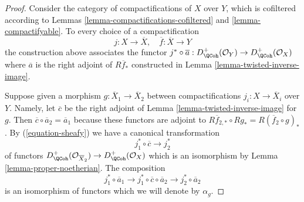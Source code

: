 \begin{proof}
Consider the category of compactifications of $X$ over $Y$,
which is cofiltered according to
Lemmas \ref{lemma-compactifications-cofiltered} and \ref{lemma-compactifyable}.
To every choice of a compactification
$$
j : X \to \overline{X},\quad \overline{f} : \overline{X} \to Y
$$
the construction above associates the functor $j^* \circ \overline{a} :
D_\QCoh^+(\mathcal{O}_Y) \to D_\QCoh^+(\mathcal{O}_X)$
where $\overline{a}$ is the right adjoint of $R\overline{f}_*$
constructed in Lemma \ref{lemma-twisted-inverse-image}.

\medskip\noindent
Suppose given a morphism $g : \overline{X}_1 \to \overline{X}_2$
between compactifications $j_i : X \to \overline{X}_i$ over $Y$.
Namely, let $\overline{c}$ be the right adjoint of
Lemma \ref{lemma-twisted-inverse-image} for $g$.
Then $\overline{c} \circ \overline{a}_2 = \overline{a}_1$
because these functors are adjoint to
$R\overline{f}_{2, *} \circ Rg_* = R(\overline{f}_2 \circ g)_*$.
By (\ref{equation-sheafy}) we have a canonical transformation
$$
j_1^* \circ \overline{c} \longrightarrow j_2^*
$$
of functors
$D^+_\QCoh(\mathcal{O}_{\overline{X}_2}) \to D^+_\QCoh(\mathcal{O}_X)$
which is an isomorphism by Lemma \ref{lemma-proper-noetherian}.
The composition
$$
j_1^* \circ \overline{a}_1 \longrightarrow
j_1^* \circ \overline{c} \circ \overline{a}_2 \longrightarrow
j_2^* \circ \overline{a}_2
$$
is an isomorphism of functors which we will denote by $\alpha_g$.


\end{proof}
